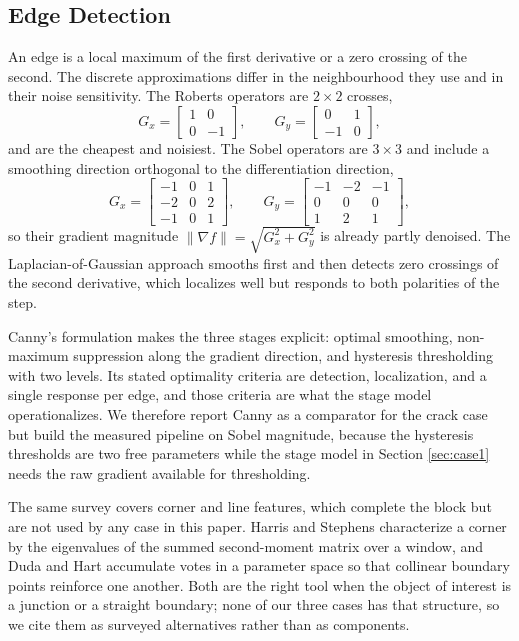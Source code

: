 \documentclass{ieeeaccess}
\begin{document}
\subsection{Edge Detection}
\label{sec:edges}
An edge is a local maximum of the first derivative or a zero crossing of the
second. The discrete approximations differ in the neighbourhood they use and in
their noise sensitivity. The Roberts operators are $2\times2$ crosses,
\begin{equation}
G_x=\begin{bmatrix}1&0\\0&-1\end{bmatrix},\qquad
G_y=\begin{bmatrix}0&1\\-1&0\end{bmatrix},
\label{eq:roberts}
\end{equation}
and are the cheapest and noisiest. The Sobel operators are $3\times3$ and
include a smoothing direction orthogonal to the differentiation direction,
\begin{equation}
G_x=\begin{bmatrix}-1&0&1\\-2&0&2\\-1&0&1\end{bmatrix},\qquad
G_y=\begin{bmatrix}-1&-2&-1\\0&0&0\\1&2&1\end{bmatrix},
\label{eq:sobel}
\end{equation}
so their gradient magnitude $\lVert\nabla f\rVert=\sqrt{G_x^2+G_y^2}$ is already
partly denoised. The Laplacian-of-Gaussian approach smooths first and then
detects zero crossings of the second derivative, which localizes well but
responds to both polarities of the step.

Canny's formulation \cite{canny1986} makes the three stages explicit: optimal
smoothing, non-maximum suppression along the gradient direction, and hysteresis
thresholding with two levels. Its stated optimality criteria are detection,
localization, and a single response per edge, and those criteria are what the
stage model operationalizes. We therefore report Canny as a comparator for the
crack case but build the measured pipeline on Sobel magnitude, because the
hysteresis thresholds are two free parameters while the stage model in
Section \ref{sec:case1} needs the raw gradient available for thresholding.

The same survey covers corner and line features, which complete the block but
are not used by any case in this paper. Harris and Stephens \cite{harris1988}
characterize a corner by the eigenvalues of the summed second-moment matrix over
a window, and Duda and Hart \cite{duda1972} accumulate votes in a parameter
space so that collinear boundary points reinforce one another. Both are the right
tool when the object of interest is a junction or a straight boundary; none of
our three cases has that structure, so we cite them as surveyed alternatives
rather than as components.
\end{document}
